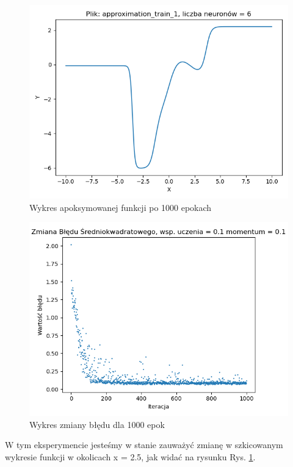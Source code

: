 \documentclass[12pt]{article}
\begin{document}
\begin{figure}[!htb]
 \centering
 \includegraphics[width=12cm]{FunctionPlot6Neuron.png}
 \caption{Wykres apoksymowanej funkcji po 1000 epokach}
 \vspace{-0.3cm}
 \label{WykresFun4}
\end{figure}



\begin{figure}[!htb]
 \centering
 \includegraphics[width=12cm]{ZmianaBledu6Neuron.png}
 \vspace{-0.3cm}
 \caption{Wykres zmiany błędu dla 1000 epok}
 \label{WykresBlad4}
\end{figure}

\newpage
W tym eksperymencie jesteśmy w stanie zauważyć zmianę w szkicowanym wykresie funkcji w okolicach x = 2.5, jak widać na rysunku Rys. \ref{WykresFun4}.
\end{document}
